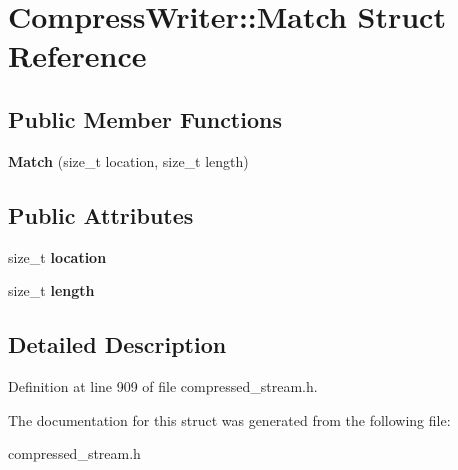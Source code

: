 \hypertarget{structCompressWriter_1_1Match}{\section{Compress\+Writer\+:\+:Match Struct Reference}
\label{structCompressWriter_1_1Match}
}
\subsection*{Public Member Functions}
\begin{DoxyCompactItemize}
\item 
\hypertarget{structCompressWriter_1_1Match_a3d6139303e8181564960d270c3b4ffd5}{{\bfseries Match} (size\+\_\+t location, size\+\_\+t length)}\label{structCompressWriter_1_1Match_a3d6139303e8181564960d270c3b4ffd5}

\end{DoxyCompactItemize}
\subsection*{Public Attributes}
\begin{DoxyCompactItemize}
\item 
\hypertarget{structCompressWriter_1_1Match_a902fb7b60d35bb8443540dda336add4a}{size\+\_\+t {\bfseries location}}\label{structCompressWriter_1_1Match_a902fb7b60d35bb8443540dda336add4a}

\item 
\hypertarget{structCompressWriter_1_1Match_aecb21869042cc75d89dfe4a58e7af34d}{size\+\_\+t {\bfseries length}}\label{structCompressWriter_1_1Match_aecb21869042cc75d89dfe4a58e7af34d}

\end{DoxyCompactItemize}


\subsection{Detailed Description}


Definition at line 909 of file compressed\+\_\+stream.\+h.



The documentation for this struct was generated from the following file\+:\begin{DoxyCompactItemize}
\item 
compressed\+\_\+stream.\+h\end{DoxyCompactItemize}
